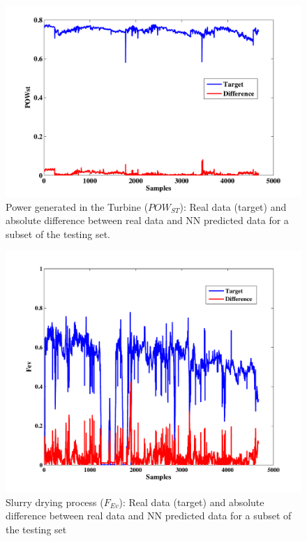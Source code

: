 \begin{figure}
\centering
\includegraphics[width=1\textwidth]{figures/POWst.pdf}
\caption{Power generated in the Turbine ($POW_{ST}$): Real data (target) and absolute difference between real data and NN predicted data for a subset of the testing set.}
\label{Pturbine}
\end{figure}

\begin{figure}
\centering
\includegraphics[width=1\textwidth]{figures/Fev.pdf}
\caption{Slurry drying process ($F_{Ev}$): Real data (target) and absolute difference between real data and NN predicted data for a subset of the testing set}
\label{PEvaporator}
\end{figure}
